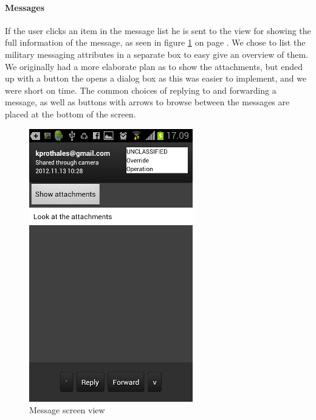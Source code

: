 \newpage

\paragraph{Messages}\hfill
\newline
If the user clicks an item in the message list he is sent to the view for showing the full information of the message, as seen in figure \ref{fig:frontend_message} on page \pageref{fig:frontend_message}. We chose to list the military messaging attributes in a separate box to easy give an overview of them. We originally had a more elaborate plan as to show the attachments, but ended up with a button the opens a dialog box as this was easier to implement, and we were short on time. 
The common choices of replying to and forwarding a message, as well as buttons with arrows to browse between the messages are placed at the bottom of the screen.

\begin{figure}[h!]
\begin{center}
\includegraphics{message_final}
\end{center}
\caption{Message screen view} \label{fig:frontend_message}
\end{figure}

